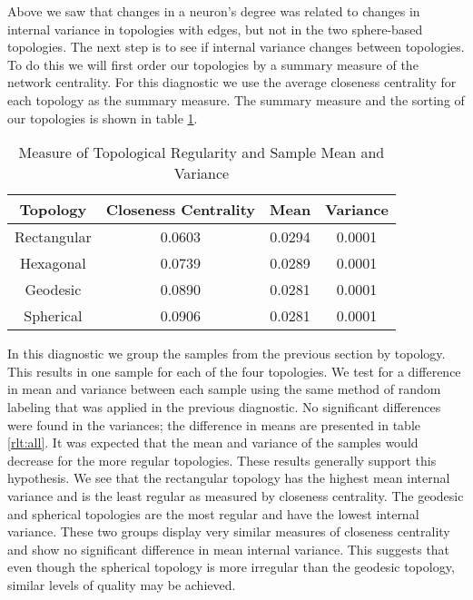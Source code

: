 Above we saw that changes in a neuron's degree was related to changes in
internal variance in topologies with edges, but not in the two sphere-based
topologies. The next step is to see if internal variance changes between
topologies.  To do this we will first order our topologies by a summary
measure of the network centrality.  For this diagnostic we use the average
closeness centrality for each topology as the summary measure.  The summary
measure and the sorting of our topologies is shown in table \ref{vardeg}.

\begin{table}
\centering
\begin{minipage}{\textwidth}
\caption{Measure of Topological Regularity and Sample Mean and Variance}
\label{vardeg}
\begin{tabular}{|c||c|c|c|}
\hline
Topology & Closeness Centrality & Mean & Variance\\
\hline
Rectangular & 0.0603 & 0.0294 &0.0001\\
Hexagonal & 0.0739 & 0.0289 &0.0001\\
Geodesic & 0.0890 & 0.0281 &0.0001\\
Spherical & 0.0906 & 0.0281 &0.0001\\
\hline
\end{tabular}
\end{minipage}
\end{table}

In this diagnostic we group the samples from the previous section by topology.
This results in one sample for each of the four topologies.  We test for a
difference in mean and variance between each sample using the same method of
random labeling that was applied in the previous diagnostic.  No significant
differences were found in the variances; the difference in means are presented
in table \ref{rlt:all}.  It was expected that the mean and variance of the
samples would decrease for the more regular topologies.  These results
generally support this hypothesis. We see that the rectangular topology has
the highest mean internal variance and is the least regular as measured by
closeness centrality. The geodesic and spherical topologies are the most
regular and have the lowest internal variance. These two groups display very
similar measures of closeness centrality and show no significant difference in
mean internal variance.  This suggests that even though the spherical topology
is more irregular than the geodesic topology, similar levels of quality may be
achieved.


